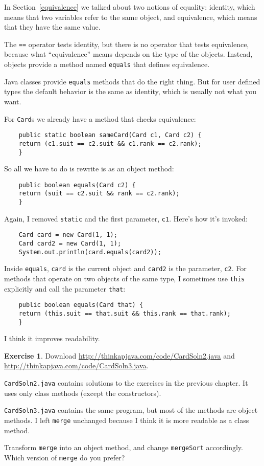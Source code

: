 \documentclass[12pt]{book}
\theoremstyle{definition}
\newtheorem{excz}{Exercise}[chapter]
\newenvironment{exercise}{\bigskip\begin{excz}\mbox{}}{\end{excz}}
\begin{document}
In Section~\ref{equivalence} we talked about two notions of equality:
identity, which means that two variables refer to the same
object, and equivalence, which means that they have the same
value.

The {\tt ==} operator tests identity, but there is no operator
that tests equivalence, because what ``equivalence'' means
depends on the type of the objects.  Instead, objects provide
a method named {\tt equals} that defines equivalence.

Java classes provide {\tt equals} methods that do the right
thing.  But for user defined types the default behavior is the
same as identity, which is usually not what you want.

For {\tt Card}s we already have a method that checks equivalence:

\begin{lstlisting}
    public static boolean sameCard(Card c1, Card c2) {
	return (c1.suit == c2.suit && c1.rank == c2.rank);
    }
\end{lstlisting}
%
So all we have to do is rewrite is as an object method:

\begin{lstlisting}
    public boolean equals(Card c2) {
	return (suit == c2.suit && rank == c2.rank);
    }
\end{lstlisting}
%
Again, I removed {\tt static} and the first parameter, {\tt c1}.
Here's how it's invoked:

\begin{lstlisting}
    Card card = new Card(1, 1);
    Card card2 = new Card(1, 1);
    System.out.println(card.equals(card2));
\end{lstlisting}
%
Inside {\tt equals}, {\tt card} is the current object and {\tt card2}
is the parameter, {\tt c2}.  For methods that operate on two objects
of the same type, I sometimes use {\tt this} explicitly and call
the parameter {\tt that}:

\begin{lstlisting}
    public boolean equals(Card that) {
	return (this.suit == that.suit && this.rank == that.rank);
    }
\end{lstlisting}
%
I think it improves readability.

\begin{exercise}

Download \url{http://thinkapjava.com/code/CardSoln2.java} and 
\url{http://thinkapjava.com/code/CardSoln3.java}.

{\tt CardSoln2.java} contains solutions to the exercises
in the previous chapter.  It uses only class methods (except the
constructors).

{\tt CardSoln3.java} contains the same program, but most of the
methods are object methods.  I left {\tt merge} unchanged because
I think it is more readable as a class method.

Transform {\tt merge} into an object method,
and change {\tt mergeSort} accordingly.  Which version of
{\tt merge} do you prefer?

\end{exercise}
\end{document}
